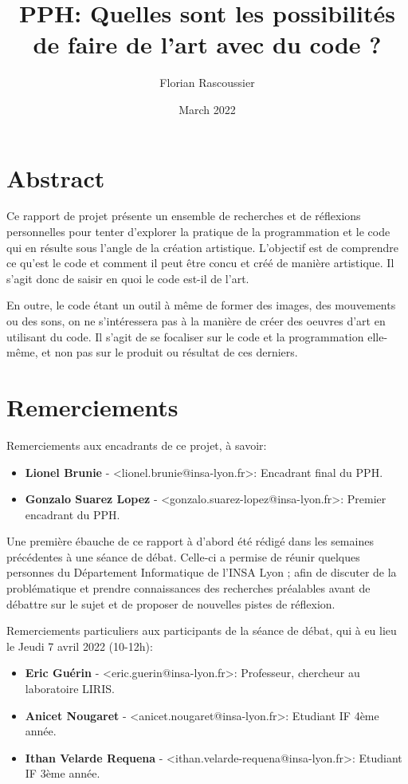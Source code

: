 \documentclass[12pt]{article} %
\title{PPH: Quelles sont les possibilités de faire de l'art avec du code ?}
\author{Florian Rascoussier}
\date{March 2022}
\begin{document}

\newpage


\newpage

\section*{Abstract}
Ce rapport de projet présente un ensemble de recherches et de réflexions personnelles pour tenter d'explorer la pratique de la programmation et le code qui en résulte sous l'angle de la création artistique. L'objectif est de comprendre ce qu'est le code et comment il peut être concu et créé de manière artistique. Il s'agit donc de saisir en quoi le code est-il de l'art.

En outre, le code étant un outil à même de former des images, des mouvements ou des sons, on ne s'intéressera pas à la manière de créer des oeuvres d'art en utilisant du code. Il s'agit de se focaliser sur le code et la programmation elle-même, et non pas sur le produit ou résultat de ces derniers.

\section*{Remerciements}
Remerciements aux encadrants de ce projet, à savoir:

\begin{itemize}
    \item \textbf{Lionel Brunie} - <lionel.brunie@insa-lyon.fr>: Encadrant final  du PPH.
    \item \textbf{Gonzalo Suarez Lopez} - <gonzalo.suarez-lopez@insa-lyon.fr>: Premier encadrant du PPH.
\end{itemize}

Une première ébauche de ce rapport à d'abord été rédigé dans les semaines précédentes à une séance de débat. Celle-ci a permise de réunir quelques personnes du Département Informatique de l'INSA Lyon ; afin de discuter de la problématique et prendre connaissances des recherches préalables avant de débattre sur le sujet et de proposer de nouvelles pistes de réflexion.

Remerciements particuliers aux participants de la séance de débat, qui à eu lieu le Jeudi 7 avril 2022 (10-12h):

\begin{itemize}
    \item \textbf{Eric Guérin} - <eric.guerin@insa-lyon.fr>: Professeur, chercheur au laboratoire LIRIS.
    \item \textbf{Anicet Nougaret} - <anicet.nougaret@insa-lyon.fr>: Etudiant IF 4ème année. 
    \item \textbf{Ithan Velarde Requena} - <ithan.velarde-requena@insa-lyon.fr>: Etudiant IF 3ème année.
\end{itemize}
\end{document}
